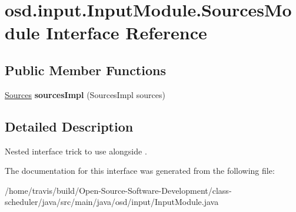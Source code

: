 \hypertarget{interfaceosd_1_1input_1_1_input_module_1_1_sources_module}{\section{osd.\-input.\-Input\-Module.\-Sources\-Module Interface Reference}
\label{interfaceosd_1_1input_1_1_input_module_1_1_sources_module}
}
\subsection*{Public Member Functions}
\begin{DoxyCompactItemize}
\item 
\hypertarget{interfaceosd_1_1input_1_1_input_module_1_1_sources_module_ac480b8bb12fb70d405265f096d4dfd8f}{\hyperlink{interfaceosd_1_1input_1_1_sources}{Sources} {\bfseries sources\-Impl} (Sources\-Impl sources)}\label{interfaceosd_1_1input_1_1_input_module_1_1_sources_module_ac480b8bb12fb70d405265f096d4dfd8f}

\end{DoxyCompactItemize}


\subsection{Detailed Description}
Nested interface trick to use  alongside . 

The documentation for this interface was generated from the following file\-:\begin{DoxyCompactItemize}
\item 
/home/travis/build/\-Open-\/\-Source-\/\-Software-\/\-Development/class-\/scheduler/java/src/main/java/osd/input/Input\-Module.\-java\end{DoxyCompactItemize}
